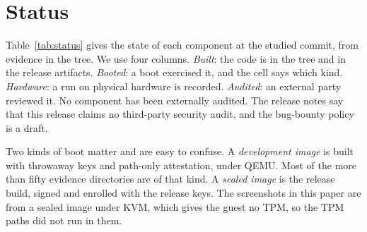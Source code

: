 \section{Status}\label{sec:status}

Table~\ref{tab:status} gives the state of each component at the studied commit, from evidence in the tree. We use four columns. \emph{Built}: the code is in the tree and in the release artifacts. \emph{Booted}: a boot exercised it, and the cell says which kind. \emph{Hardware}: a run on physical hardware is recorded. \emph{Audited}: an external party reviewed it. No component has been externally audited. The release notes say that this release claims no third-party security audit, and the bug-bounty policy is a draft.

Two kinds of boot matter and are easy to confuse. A \emph{development image} is built with throwaway keys and path-only attestation, under QEMU. Most of the more than fifty evidence directories are of that kind. A \emph{sealed image} is the release build, signed and enrolled with the release keys. The screenshots in this paper are from a sealed image under KVM, which gives the guest no TPM, so the TPM paths did not run in them.

